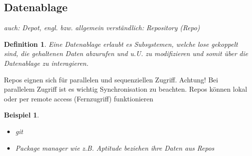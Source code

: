 \documentclass[a4paper]{article}
\theoremstyle{break}
\newtheorem{defi}{Definition}[section]
\newtheorem{ex}{Beispiel}[section]
\begin{document}
\subsection{Datenablage}
\textit{auch: Depot, engl. bzw. allgemein verständlich: Repository (Repo)}
\begin{defi}
	Eine Datenablage erlaubt es Subsystemen, welche lose gekoppelt sind, die gehaltenen Daten abzurufen und u.U. zu modifizieren und somit über die Datenablage zu interagieren.
\end{defi}
Repos eignen sich für parallelen und sequenziellen Zugriff. Achtung! Bei parallelem Zugriff ist es wichtig Synchronisation zu beachten.
Repos können lokal oder per remote access (Fernzugriff) funktionieren
\begin{ex}
	\begin{itemize}
		\item git
		\item Package manager wie z.B. Aptitude beziehen ihre Daten aus Repos
	\end{itemize}
\end{ex}
\end{document}
